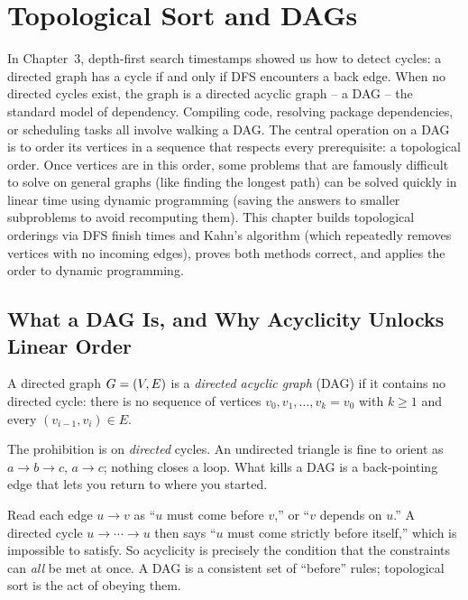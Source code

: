 \chapter{Topological Sort and DAGs}

In Chapter~3, depth-first search timestamps showed us how to detect cycles:
a directed graph has a cycle if and only if DFS encounters a back edge.
When no directed cycles exist, the graph is a directed acyclic graph -- a DAG --
the standard model of dependency. Compiling code, resolving package
dependencies, or scheduling tasks all involve walking a DAG. The central operation on
a DAG is to order its vertices in a sequence that respects every prerequisite:
a topological order. Once vertices are in this order, some problems that are
famously difficult to solve on general graphs (like finding the longest path)
can be solved quickly in linear time using dynamic programming (saving the answers
to smaller subproblems to avoid recomputing them). This chapter builds topological orderings via DFS finish times and Kahn's
algorithm (which repeatedly removes vertices with no incoming edges), proves both methods correct, and applies the order to
dynamic programming.

\chapterline

\section{What a DAG Is, and Why Acyclicity Unlocks Linear Order}

\begin{definition}\label{ch04:dag-def}
A directed graph $G=(V,E)$ is a \emph{directed acyclic graph} (DAG) if it contains no directed
cycle: there is no sequence of vertices $v_0,v_1,\dots,v_k=v_0$ with $k\ge 1$ and every
$(v_{i-1},v_i)\in E$.
\end{definition}

The prohibition is on \emph{directed} cycles. An undirected triangle is fine to orient as
$a\to b\to c$, $a\to c$; nothing closes a loop. What kills a DAG is a back-pointing edge that lets
you return to where you started.

\begin{intuitionbox}
Read each edge $u\to v$ as ``$u$ must come before $v$,'' or ``$v$ depends on $u$.'' A directed cycle
$u\to\cdots\to u$ then says ``$u$ must come strictly before itself,'' which is impossible to satisfy.
So acyclicity is precisely the condition that the constraints can \emph{all} be met at once. A DAG is
a consistent set of ``before'' rules; topological sort is the act of obeying them.
\end{intuitionbox}

